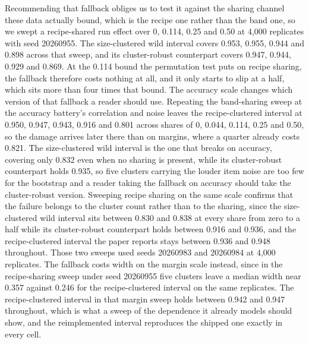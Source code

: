 Recommending that fallback obliges us to test it against the sharing channel these data actually bound, which is the recipe one rather than the band one, so we swept a recipe-shared run effect over 0, 0.114, 0.25 and 0.50 at 4,000 replicates with seed 20260955. The size-clustered wild interval covers 0.953, 0.955, 0.944 and 0.898 across that sweep, and its cluster-robust counterpart covers 0.947, 0.944, 0.929 and 0.869. At the 0.114 bound the permutation test puts on recipe sharing, the fallback therefore costs nothing at all, and it only starts to slip at a half, which sits more than four times that bound. The accuracy scale changes which version of that fallback a reader should use. Repeating the band-sharing sweep at the accuracy battery's correlation and noise leaves the recipe-clustered interval at 0.950, 0.947, 0.943, 0.916 and 0.801 across shares of 0, 0.044, 0.114, 0.25 and 0.50, so the damage arrives later there than on margins, where a quarter already costs 0.821. The size-clustered wild interval is the one that breaks on accuracy, covering only 0.832 even when no sharing is present, while its cluster-robust counterpart holds 0.935, so five clusters carrying the louder item noise are too few for the bootstrap and a reader taking the fallback on accuracy should take the cluster-robust version. Sweeping recipe sharing on the same scale confirms that the failure belongs to the cluster count rather than to the sharing, since the size-clustered wild interval sits between 0.830 and 0.838 at every share from zero to a half while its cluster-robust counterpart holds between 0.916 and 0.936, and the recipe-clustered interval the paper reports stays between 0.936 and 0.948 throughout. Those two sweeps used seeds 20260983 and 20260984 at 4,000 replicates. The fallback costs width on the margin scale instead, since in the recipe-sharing sweep under seed 20260955 five clusters leave a median width near 0.357 against 0.246 for the recipe-clustered interval on the same replicates. The recipe-clustered interval in that margin sweep holds between 0.942 and 0.947 throughout, which is what a sweep of the dependence it already models should show, and the reimplemented interval reproduces the shipped one exactly in every cell.

